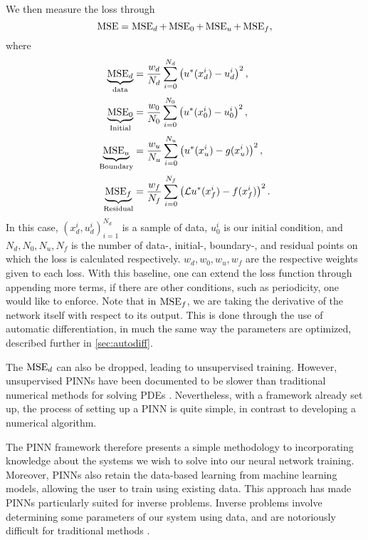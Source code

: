 We then measure the loss through
\begin{equation}\label{eq:PINNMSE}
    \operatorname{MSE} = \operatorname{MSE}_d + \operatorname{MSE}_0 + \operatorname{MSE}_u + \operatorname{MSE}_f,
\end{equation}
where
\begin{equation*}
\begin{split}
    \underbrace{\operatorname{MSE}_d}_{\text{data}} &= \frac{w_d}{N_d} \sum_{i = 0}^{N_d} \left( u^*(x_d^i) - u_d^i \right)^2,  \\
    \underbrace{\operatorname{MSE}_0}_{\text{Initial}} &= \frac{w_0}{N_0} \sum_{i = 0}^{N_0} \left( u^*(x_0^i) - u_0^i \right)^2,  \\
    \underbrace{\operatorname{MSE}_u}_{\text{Boundary}} &= \frac{w_u}{N_u} \sum_{i = 0}^{N_u} \left( u^*(x_u^i) - g(x_u^i) \right)^2, \\
    \underbrace{\operatorname{MSE}_f}_{\text{Residual}} &= \frac{w_f}{N_f} \sum_{i = 0}^{N_f} \left( \mathcal{L}u^*(x_f^i) - f(x_f^i) \right)^2.
\end{split}
\end{equation*}
In this case, $(x_d^i,u_d^i)_{i=1}^{N_d}$ is a sample of data, $u_0^i$ is our initial condition, and $N_d,N_0,N_u,N_f$ is the number of data-, initial-, boundary-, and residual points on which the loss is calculated respectively. $w_d,w_0,w_u,w_f$ are the respective weights given to each loss. 
With this baseline, one can extend the loss function through appending more terms, if there are other conditions, such as periodicity, one would like to enforce.
Note that in $\operatorname{MSE}_f$, we are taking the derivative of the network itself with respect to its output.
This is done through the use of automatic differentiation, in much the same way the parameters are optimized, described further in \autoref{sec:autodiff}.

The $\operatorname{MSE}_d$ can also be dropped, leading to unsupervised training. However, unsupervised PINNs have been documented to be slower than traditional numerical methods for solving PDEs \cite{en16124558}.
Nevertheless, with a framework already set up, the process of setting up a PINN is quite simple, in contrast to developing a numerical algorithm.

The PINN framework therefore presents a simple methodology to incorporating knowledge about the systems we wish to solve into our neural network training. 
Moreover, PINNs also retain the data-based learning from machine learning models, allowing the user to train using existing data. 
This approach has made PINNs particularly suited for inverse problems. Inverse problems involve determining some parameters of our system using data, and are notoriously difficult for traditional methods \cite{Jagtap_2022,garay2023physicsinformed}.

